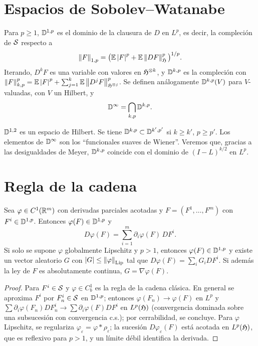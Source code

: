 \section{Espacios de Sobolev--Watanabe}

\begin{definicion}
Para $p\ge1$, $\mathbb{D}^{1,p}$ es el dominio de la clausura de $D$ en $L^p$, es decir, la
compleción de $\mathcal{S}$ respecto a
\[
  \left\lVert F\right\rVert_{1,p}=\big(\mathbb{E}\left\lvert F\right\rvert^p+\mathbb{E}\left\lVert DF\right\rVert_{\mathfrak{H}}^p\big)^{1/p}.
\]
Iterando, $D^kF$ es una variable con valores en $\mathfrak{H}^{\otimes k}$, y $\mathbb{D}^{k,p}$ es la compleción con $\left\lVert F\right\rVert_{k,p}^p=
\mathbb{E}\left\lvert F\right\rvert^p+\sum_{j=1}^k\mathbb{E}\left\lVert D^jF\right\rVert^p_{\mathfrak{H}^{\otimes j}}$. Se definen análogamente $\mathbb{D}^{k,p}(V)$ para $V$-valuadas, con $V$ un
Hilbert, y
\[
  \mathbb{D}^\infty=\bigcap_{k,p}\mathbb{D}^{k,p}.
\]
\end{definicion}

$\mathbb{D}^{1,2}$ es un espacio de Hilbert. Se tiene $\mathbb{D}^{k,p}\subset\mathbb{D}^{k',p'}$ si $k\ge k'$, $p\ge p'$. Los elementos de $\mathbb{D}^\infty$
son los ``funcionales suaves de Wiener''. Veremos que, gracias a las desigualdades de Meyer, $\mathbb{D}^{k,p}$
coincide con el dominio de $(I-L)^{k/2}$ en $L^p$.

\section{Regla de la cadena}

\begin{proposicion}\label{prop:cadena}
Sea $\varphi\in C^1(\mathbb{R}^m)$ con derivadas parciales acotadas y
$F=(F^1,\dots,F^m)$ con $F^i\in\mathbb{D}^{1,p}$. Entonces $\varphi(F)\in\mathbb{D}^{1,p}$ y
\[
  D\varphi(F)=\sum_{i=1}^m\partial_i\varphi(F)\,DF^i.
\]
Si solo se supone $\varphi$ globalmente Lipschitz y $p>1$, entonces $\varphi(F)\in\mathbb{D}^{1,p}$ y existe un vector aleatorio
$G$ con $\left\lvert G\right\rvert\le\left\lVert \varphi\right\rVert_{\mathrm{Lip}}$ tal que $D\varphi(F)=\sum_iG_iDF^i$. Si además la ley de $F$ es absolutamente
continua, $G=\nabla\varphi(F)$.
\end{proposicion}

\begin{proof}
Para $F^i\in\mathcal{S}$ y $\varphi\in C_b^1$ es la regla de la cadena clásica. En general se aproxima
$F^i$ por $F^i_n\in\mathcal{S}$ en $\mathbb{D}^{1,p}$; entonces $\varphi(F_n)\to\varphi(F)$ en $L^p$ y $\sum\partial_i\varphi(F_n)DF^i_n\to\sum\partial_i\varphi(F)DF^i$ en
$L^p(\mathfrak{H})$ (convergencia dominada sobre una subsucesión con convergencia c.s.); por cerrabilidad,
se concluye. Para $\varphi$ Lipschitz, se regulariza $\varphi_\varepsilon=\varphi*\rho_\varepsilon$; la sucesión $D\varphi_\varepsilon(F)$ está acotada en
$L^p(\mathfrak{H})$, que es reflexivo para $p>1$, y un límite débil identifica la derivada.
\end{proof}

